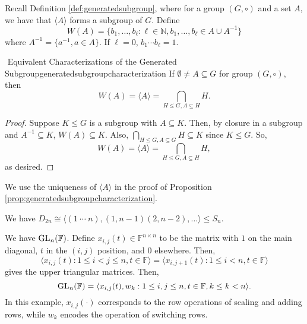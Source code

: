         Recall Definition \ref{def:generatedsubgroup}, where for a group \((G,\circ)\) and a set \(A\), we have that \(\langle A\rangle\) forms a subgroup of \(G\). Define
        \begin{equation*}
            W(A)=\{b_1,\ldots,b_\ell:\ell\in\mathbb{N},b_1,\ldots,b_\ell\in A\cup A^{-1}\}
        \end{equation*}
        where \(A^{-1}=\{a^{-1},a\in A\}\). If \(\ell=0\), \(b_1\cdots b_\ell=1\). 
        \begin{proposition}{\Stop\,\,Equivalent Characterizations of the Generated Subgroup}{generatedsubgroupcharacterization}
            If \(\emptyset\neq A\subseteq G\) for group \((G,\circ)\), then
            \begin{equation*}
                W(A)=\langle A\rangle=\bigcap_{H\leq G,A\subseteq H}H.
            \end{equation*}
            \begin{proof}
                Suppose \(K\leq G\) is a subgroup with \(A\subseteq K\). Then, by closure in a subgroup and \(A^{-1}\subseteq K\), \(W(A)\subseteq K\). Also, \(\bigcap_{H\leq G,A\subseteq G}H\subseteq K\) since \(K\leq G\). So, 
                \begin{equation*}
                    W(A)=\langle A\rangle=\bigcap_{H\leq G,A\subseteq H}H,
                \end{equation*}
                as desired.
            \end{proof}
        \end{proposition}
        \begin{remark*}
            We use the uniqueness of \(\langle A \rangle\) in the proof of Proposition \ref{prop:generatedsubgroupcharacterization}.
        \end{remark*}
        \begin{example}
            We have \(D_{2n}\cong \langle (1\ \cdots\ n), (1,n-1)(2,n-2),\ldots \rangle\leq S_n\).
        \end{example}
        \begin{example}
            We have \(\operatorname{GL}_n(\mathbb{F})\). Define \(x_{i,j}(t)\in\mathbb{F}^{n\times n}\) to be the matrix with \(1\) on the main diagonal, \(t\) in the \((i,j)\) position, and \(0\) elsewhere. Then,
            \begin{equation*}
                \langle x_{i,j}(t):1\leq i<j\leq n, t\in\mathbb{F}\rangle=\langle x_{i,j+1}(t):1\leq i< n, t\in\mathbb{F}\rangle
            \end{equation*}
            gives the upper triangular matrices. Then,
            \begin{equation*}
                \operatorname{GL}_n(\mathbb{F})=\langle x_{i,j}(t), w_k:1\leq i, j\leq n, t\in\mathbb{F}, k\leq k< n \rangle.
            \end{equation*}
            In this example, \(x_{i,j}(\cdot)\) corresponds to the row operations of scaling and adding rows, while \(w_k\) encodes the operation of switching rows.
        \end{example}
